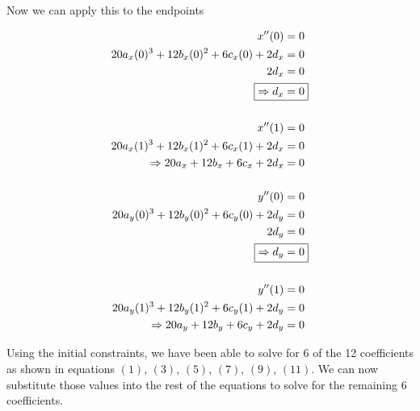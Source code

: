 \documentclass[12pt, letterpaper]{article}
\begin{document}
\newpage
Now we can apply this to the endpoints

\begin{align}
x''(0) &= 0 \nonumber \\
20a_x(0)^3 + 12b_x(0)^2 + 6c_x(0) + 2d_x &= 0 \nonumber \\
2d_x &= 0 \nonumber \\
\Aboxed{\Rightarrow d_x &= 0} \\
\nonumber \\
x''(1) &= 0 \nonumber \\
20a_x(1)^3 + 12b_x(1)^2 + 6c_x(1) + 2d_x &= 0 \nonumber \\
\Rightarrow 20a_x + 12b_x + 6c_x + 2d_x &= 0 \\
\nonumber \\
y''(0) &= 0 \nonumber \\
20a_y(0)^3 + 12b_y(0)^2 + 6c_y(0) + 2d_y &= 0 \nonumber \\
2d_y &= 0 \nonumber \\
\Aboxed{\Rightarrow d_y &= 0} \\
\nonumber \\
y''(1) &= 0 \nonumber \\
20a_y(1)^3 + 12b_y(1)^2 + 6c_y(1) + 2d_y &= 0 \nonumber \\
\Rightarrow 20a_y + 12b_y + 6c_y + 2d_y &= 0 
\end{align}

\newpage
Using the initial constraints, we have been able to solve for 6 of the 12 coefficients as shown in equations \((1)\), \((3)\), \((5)\), \((7)\), \((9)\), \((11)\). We can now substitute those values into the rest of the equations to solve for the remaining 6 coefficients. \\
\end{document}
